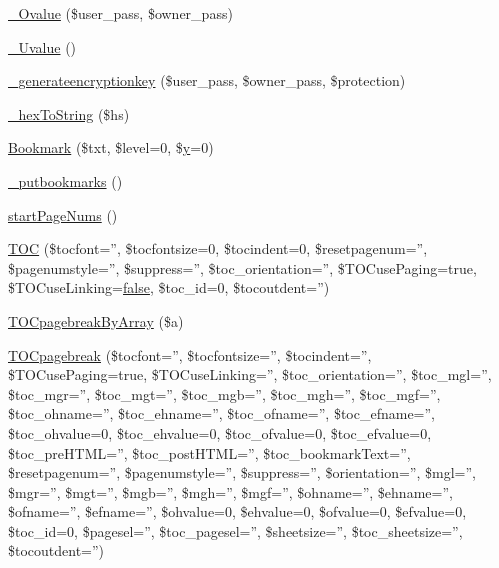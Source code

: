 \begin{DoxyCompactItemize}
\hyperlink{classm_p_d_f_a2b749ec66c9eb3773dd9f08d949ebfae}{\-\_\-\-Ovalue} (\$user\-\_\-pass, \$owner\-\_\-pass)
\item 
\hyperlink{classm_p_d_f_a89e4344742a94ffe4d6791560a239ee6}{\-\_\-\-Uvalue} ()
\item 
\hyperlink{classm_p_d_f_a0850dd55d76cb32398d1158589c28c7e}{\-\_\-generateencryptionkey} (\$user\-\_\-pass, \$owner\-\_\-pass, \$protection)
\item 
\hyperlink{classm_p_d_f_a2b1c507460fe2254fba0646bcb45a860}{\-\_\-hex\-To\-String} (\$hs)
\item 
\hyperlink{classm_p_d_f_aad5aae9abbf271454a77845a5d9cdc55}{Bookmark} (\$txt, \$level=0, \$\hyperlink{example43___m_p_d_f_i__booklet_8php_a3f83be162d14f38451e1bc419fbbbcbc}{y}=0)
\item 
\hyperlink{classm_p_d_f_ae41527a8f762be758f87de0745bf17ce}{\-\_\-putbookmarks} ()
\item 
\hyperlink{classm_p_d_f_a55a2e2391e20008666af0565334de2ab}{start\-Page\-Nums} ()
\item 
\hyperlink{classm_p_d_f_a612e455ee6c6b5cbb466175bbc049127}{T\-O\-C} (\$tocfont='', \$tocfontsize=0, \$tocindent=0, \$resetpagenum='', \$pagenumstyle='', \$suppress='', \$toc\-\_\-orientation='', \$T\-O\-Cuse\-Paging=true, \$T\-O\-Cuse\-Linking=\hyperlink{ttfontsuni_8php_afbaa04e5cc97693dc668b3c45d3dd740}{false}, \$toc\-\_\-id=0, \$tocoutdent='')
\item 
\hyperlink{classm_p_d_f_af7b7991d8b15e1d6810430d69a1fc88c}{T\-O\-Cpagebreak\-By\-Array} (\$a)
\item 
\hyperlink{classm_p_d_f_a391d4b430edd22c1c4a84dde18963fed}{T\-O\-Cpagebreak} (\$tocfont='', \$tocfontsize='', \$tocindent='', \$T\-O\-Cuse\-Paging=true, \$T\-O\-Cuse\-Linking='', \$toc\-\_\-orientation='', \$toc\-\_\-mgl='', \$toc\-\_\-mgr='', \$toc\-\_\-mgt='', \$toc\-\_\-mgb='', \$toc\-\_\-mgh='', \$toc\-\_\-mgf='', \$toc\-\_\-ohname='', \$toc\-\_\-ehname='', \$toc\-\_\-ofname='', \$toc\-\_\-efname='', \$toc\-\_\-ohvalue=0, \$toc\-\_\-ehvalue=0, \$toc\-\_\-ofvalue=0, \$toc\-\_\-efvalue=0, \$toc\-\_\-pre\-H\-T\-M\-L='', \$toc\-\_\-post\-H\-T\-M\-L='', \$toc\-\_\-bookmark\-Text='', \$resetpagenum='', \$pagenumstyle='', \$suppress='', \$orientation='', \$mgl='', \$mgr='', \$mgt='', \$mgb='', \$mgh='', \$mgf='', \$ohname='', \$ehname='', \$ofname='', \$efname='', \$ohvalue=0, \$ehvalue=0, \$ofvalue=0, \$efvalue=0, \$toc\-\_\-id=0, \$pagesel='', \$toc\-\_\-pagesel='', \$sheetsize='', \$toc\-\_\-sheetsize='', \$tocoutdent='')
\item 

\end{DoxyCompactItemize}

